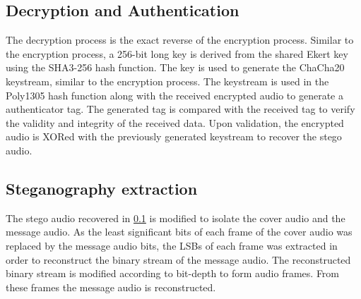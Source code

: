 \documentclass[a4paper]{cas-sc}
\begin{document}
\subsection{Decryption and Authentication}
\label{sec:chacha20poly1305decryption}
The decryption process is the exact reverse of the encryption process. Similar to the encryption process, a 256-bit long key is derived from the shared Ekert key using the SHA3-256 hash function. The key is used to generate the ChaCha20 keystream, similar to the encryption process. The keystream is used in the Poly1305 hash function along with the received encrypted audio to generate a authenticator tag. The generated tag is compared with the received tag to verify the validity and integrity of the received data. Upon validation, the encrypted audio is XORed with the previously generated keystream to recover the stego audio.
\subsection{Steganography extraction}
\label{sec:stegoExtract}
The stego audio recovered in \ref{sec:chacha20poly1305decryption} is modified to isolate the cover audio and the message audio. As the least significant bits of each frame of the cover audio was replaced by the message audio bits, the LSBs of each frame was extracted in order to reconstruct the binary stream of the message audio. The reconstructed binary stream is modified according to bit-depth to form audio frames. From these frames the message audio is reconstructed.
\end{document}
